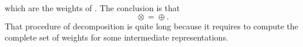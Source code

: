 
 

\newcommand{\tikzsetnextfilename}[1]{}

 

which are the weights of . The conclusion is that
\begin{equation}
    \text{}\otimes\text{}=\text{}\oplus\text{}.
\end{equation}
That procedure of decomposition is quite long because it requires to compute the complete set of weights for some intermediate representations.


